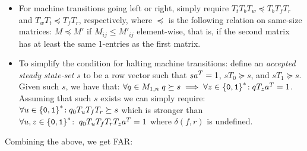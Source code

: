 \begin{itemize}

    \item For machine transitions going left or right, simply require $T_t T_b T_w\preceq T_b T_f T_r$ and $T_w T_t\preceq T_f T_r$, respectively, where $\preceq$ is the following relation on same-size matrices: $M\preceq M'$ if $M_{ij}\le M'_{ij}$ element-wise, that is, if the second matrix has at least the same 1-entries as the first matrix.

    \item To simplify the condition for halting machine transitions: define an \emph{accepted steady state-set} $s$ to be a row vector such that $sa^{T} = 1$, $s T_0\succeq s$, and $s T_1\succeq s$. Given such $s$, we have that: $\forall q\in M_{1,n}\; q \succeq s\implies \forall z\in\left\{\texttt{0},\texttt{1}\right\}^*\!: qT_{z}a^{T} = 1$. Assuming that such $s$ exists we can simply require: $\forall u\in\left\{\texttt{0},\texttt{1}\right\}^*\!: q_0T_u T_f T_r \succeq s$ which is stronger than $\forall u,z\in\left\{\texttt{0},\texttt{1}\right\}^*\!: \; q_0 T_u T_f T_r T_z a^{T} = 1$ where $\delta(f,r)$ is undefined.



\end{itemize}

Combining the above, we get FAR:



